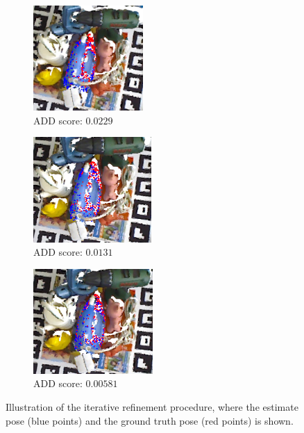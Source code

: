 \documentclass[../main.tex]{subfiles}
\begin{document}
\begin{figure}[H]
    \centering
    \begin{subfigure}[t]{0.3\textwidth}
        \centering
        \captionsetup{width=.9\textwidth}
        \includegraphics[height=40mm, keepaspectratio]{figures/dense_fusion/iron_refinement_0.png}
        \caption{ADD score: $0.0229$}
        \label{subfig:iron_refinement_0}
    \end{subfigure}
    \begin{subfigure}[t]{0.3\textwidth}
        \centering
        \captionsetup{width=.9\textwidth}
        \includegraphics[height=40mm, keepaspectratio]{figures/dense_fusion/iron_refinement_1.png}
        \caption{ADD score: $0.0131$}
        \label{subfig:iron_refinement_1}
    \end{subfigure}
    \begin{subfigure}[t]{0.3\textwidth}
        \centering
        \captionsetup{width=.9\textwidth}
        \includegraphics[height=40mm, keepaspectratio]{figures/dense_fusion/iron_refinement_2.png}
        \caption{ADD score: $0.00581$}
        \label{subfig:iron_refinement_2}
    \end{subfigure}
    \caption{Illustration of the iterative refinement procedure, where the estimate pose (blue points) and the ground truth pose (red points) is shown.}
    \label{fig:refinement_procedure}
\end{figure}
\end{document}

